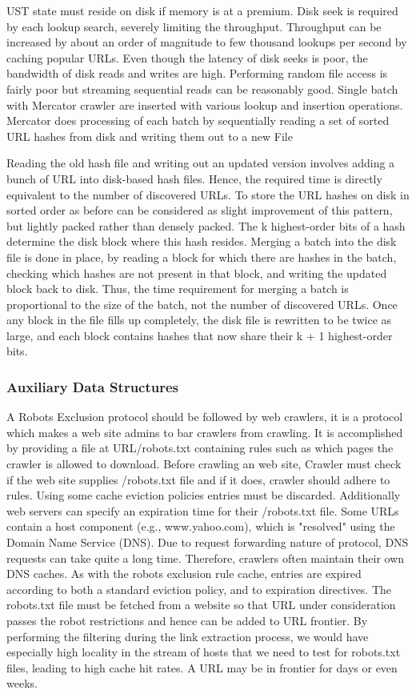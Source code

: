 \documentclass[article,type=msc,colorback,accentcolor=tud9c,twoside,11pt]{tudthesis}
\begin{document}
	UST state must reside on disk if memory is at a premium. Disk seek is required by each lookup search, severely limiting the throughput. Throughput can be increased by about an order of magnitude\cite{Graphstructure} to few thousand lookups per second by caching popular URLs. Even though the latency of disk seeks is poor, the bandwidth of disk reads and writes are high. Performing random file access is fairly poor but streaming sequential reads can be reasonably good. Single batch with Mercator crawler are inserted with various lookup and insertion operations. Mercator does processing of each batch by sequentially reading a set of sorted URL hashes from disk and writing them out to a new File\cite{Highperformancewebcrawling}
	
	Reading the old hash file and writing out an updated version involves adding a bunch of URL into disk-based hash files. Hence, the required time is directly equivalent to the number of discovered URLs. To store the URL hashes on disk in sorted order as before can be considered as slight improvement of this pattern, but lightly packed rather than densely packed. The k highest-order bits of a hash determine the disk block where this hash resides. Merging a batch into the disk file is done in place, by reading a block for which there are hashes in the batch, checking which hashes are not present in that block, and writing the updated block back to disk. Thus, the time requirement for merging a batch is proportional to the size of the batch, not the number of discovered URLs. Once any block in the file fills up completely, the disk file is rewritten to be twice as large, and each block contains hashes that now share their k + 1 highest-order bits.
	
	\subsubsection{Auxiliary Data Structures}
	A Robots Exclusion protocol should be followed by web crawlers, it is a protocol which makes a web site admins to bar crawlers from crawling. It is accomplished by providing a file at URL/robots.txt containing rules such as which pages the crawler is allowed to download. Before crawling an web site, Crawler must check if the web site supplies /robots.txt file and if it does, crawler should adhere to rules. Using some cache eviction policies entries must be discarded. Additionally web servers can specify an expiration time for their /robots.txt file. Some URLs contain a host component (e.g., www.yahoo.com), which is "resolved" using the Domain Name Service (DNS). Due to request forwarding nature of protocol, DNS requests can take quite a long time. Therefore, crawlers often maintain their own DNS caches. As with the robots exclusion rule cache, entries are expired according to both a standard eviction policy, and to expiration directives. The robots.txt file must be fetched from a website so that URL under consideration passes the robot restrictions and hence can be added to URL frontier. By performing the filtering during the link extraction process, we would have especially high locality in the stream of hosts that we need to test for robots.txt files, leading to high cache hit rates. A URL may be in frontier for days or even weeks.
	
\end{document}
